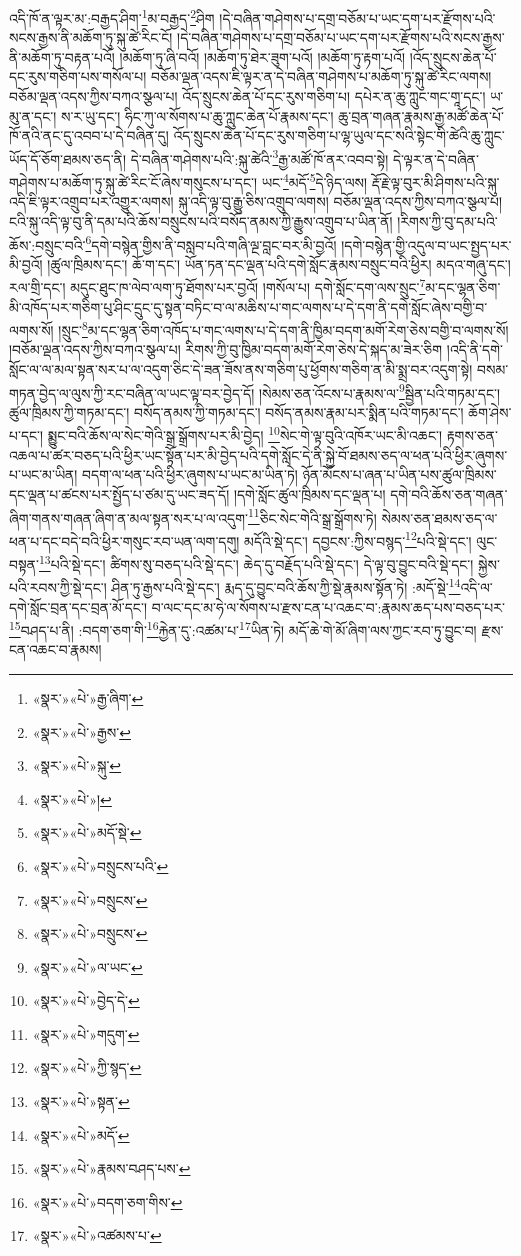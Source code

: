 འདི་ཁོ་ན་ལྟར་མ་:བརྒྱད་ཤིག་\footnote{«སྣར་»«པེ་»རྒྱ་ཞིག་}མ་བརྒྱད་\footnote{«སྣར་»«པེ་»རྒྱས་}ཤིག །དེ་བཞིན་གཤེགས་པ་དགྲ་བཅོམ་པ་ཡང་དག་པར་རྫོགས་པའི་སངས་རྒྱས་ནི་མཆོག་ཏུ་སྐུ་ཚེ་རིང་ངོ། །དེ་བཞིན་གཤེགས་པ་དགྲ་བཅོམ་པ་ཡང་དག་པར་རྫོགས་པའི་སངས་རྒྱས་ནི་མཆོག་ཏུ་བརྟན་པའོ། །མཆོག་ཏུ་ཞི་བའོ། །མཆོག་ཏུ་ཐེར་ཟུག་པའོ། །མཆོག་ཏུ་རྟག་པའོ། །འོད་སྲུངས་ཆེན་པོ་དང་རུས་གཅིག་པས་གསོལ་པ། བཅོམ་ལྡན་འདས་ཇི་ལྟར་ན་དེ་བཞིན་གཤེགས་པ་མཆོག་ཏུ་སྐུ་ཚེ་རིང་ལགས། བཅོམ་ལྡན་འདས་ཀྱིས་བཀའ་སྩལ་པ། འོད་སྲུངས་ཆེན་པོ་དང་རུས་གཅིག་པ། དཔེར་ན་ཆུ་ཀླུང་གང་གཱ་དང་། ཡ་མུ་ན་དང་། ས་ར་ཡུ་དང་། ཧིང་ཀུ་ལ་སོགས་པ་ཆུ་ཀླུང་ཆེན་པོ་རྣམས་དང་། ཆུ་བྲན་གཞན་རྣམས་རྒྱ་མཚོ་ཆེན་པོ་ཁོ་ནའི་ནང་དུ་འབབ་པ་དེ་བཞིན་དུ། འོད་སྲུངས་ཆེན་པོ་དང་རུས་གཅིག་པ་ལྷ་ཡུལ་དང་སའི་སྟེང་གི་ཚེའི་ཆུ་ཀླུང་ཡོད་དོ་ཅོག་ཐམས་ཅད་ནི། དེ་བཞིན་གཤེགས་པའི་:སྐུ་ཚེའི་\footnote{«སྣར་»«པེ་»སྐུ་}རྒྱ་མཚོ་ཁོ་ནར་འབབ་སྟེ། དེ་ལྟར་ན་དེ་བཞིན་གཤེགས་པ་མཆོག་ཏུ་སྐུ་ཚེ་རིང་ངོ་ཞེས་གསུངས་པ་དང་། ཡང་\footnote{«སྣར་»«པེ་»།}མདོ་\footnote{«སྣར་»«པེ་»མདོ་སྡེ་}དེ་ཉིད་ལས། རྡོ་རྗེ་ལྟ་བུར་མི་ཤིགས་པའི་སྐུ་འདི་ཇི་ལྟར་འགྲུབ་པར་འགྱུར་ལགས། སྐུ་འདི་ལྟ་བུ་རྒྱུ་ཅིས་འགྲུབ་ལགས། བཅོམ་ལྡན་འདས་ཀྱིས་བཀའ་སྩལ་པ། ངའི་སྐུ་འདི་ལྟ་བུ་ནི་དམ་པའི་ཆོས་བསྲུངས་པའི་བསོད་ནམས་ཀྱི་རྒྱུས་འགྲུབ་པ་ཡིན་ནོ། །རིགས་ཀྱི་བུ་དམ་པའི་ཆོས་:བསྲུང་བའི་\footnote{«སྣར་»«པེ་»བསྲུངས་པའི་}དགེ་བསྙེན་གྱིས་ནི་བསླབ་པའི་གཞི་ལྔ་བླང་བར་མི་བྱའོ། །དགེ་བསྙེན་གྱི་འདུལ་བ་ཡང་སྤྱད་པར་མི་བྱའོ། །ཚུལ་ཁྲིམས་དང་། ཆོ་ག་དང་། ཡོན་ཏན་དང་ལྡན་པའི་དགེ་སློང་རྣམས་བསྲུང་བའི་ཕྱིར། མདའ་གཞུ་དང་། རལ་གྲི་དང་། མདུང་ཐུང་ཁ་ལེབ་ལག་ཏུ་ཐོགས་པར་བྱའོ། །གསོལ་པ། དགེ་སློང་དག་ལས་སྲུང་\footnote{«སྣར་»«པེ་»བསྲུངས་}མ་དང་ལྷན་ཅིག་མི་འཁོད་པར་གཅིག་པུ་ཤིང་དྲུང་དུ་སྟན་བཏིང་བ་ལ་མཆིས་པ་གང་ལགས་པ་དེ་དག་ནི་དགེ་སློང་ཞེས་བགྱི་བ་ལགས་སོ། །སྲུང་\footnote{«སྣར་»«པེ་»བསྲུངས་}མ་དང་ལྷན་ཅིག་འཁོད་པ་གང་ལགས་པ་དེ་དག་ནི་ཁྱིམ་བདག་མགོ་རེག་ཅེས་བགྱི་བ་ལགས་སོ། །བཅོམ་ལྡན་འདས་ཀྱིས་བཀའ་སྩལ་པ། རིགས་ཀྱི་བུ་ཁྱིམ་བདག་མགོ་རེག་ཅེས་དེ་སྐད་མ་ཟེར་ཅིག །འདི་ནི་དགེ་སློང་ལ་ལ་མལ་སྟན་སར་པ་ལ་འདུག་ཅིང་དེ་ཟན་ཟོས་ནས་གཅིག་པུ་ཕྱོགས་གཅིག་ན་མི་སྨྲ་བར་འདུག་སྟེ། བསམ་གཏན་བྱེད་ལ་ལུས་ཀྱི་རང་བཞིན་ལ་ཡང་ལྟ་བར་བྱེད་དོ། །སེམས་ཅན་འོངས་པ་རྣམས་ལ་\footnote{«སྣར་»«པེ་»ལ་ཡང་}སྦྱིན་པའི་གཏམ་དང་། ཚུལ་ཁྲིམས་ཀྱི་གཏམ་དང་། བསོད་ནམས་ཀྱི་གཏམ་དང་། བསོད་ནམས་རྣམ་པར་སྨིན་པའི་གཏམ་དང་། ཆོག་ཤེས་པ་དང་། སྨྱུང་བའི་ཆོས་ལ་སེང་གེའི་སྒྲ་སྒྲོགས་པར་མི་བྱེད། \footnote{«སྣར་»«པེ་»བྱེད་དེ་}སེང་གེ་ལྟ་བུའི་འཁོར་ཡང་མི་འཆང་། རྟགས་ཅན་འཆལ་པ་ཚར་བཅད་པའི་ཕྱིར་ཡང་སྟོན་པར་མི་བྱེད་པའི་དགེ་སློང་དེ་ནི་སྐྱེ་བོ་ཐམས་ཅད་ལ་ཕན་པའི་ཕྱིར་ཞུགས་པ་ཡང་མ་ཡིན། བདག་ལ་ཕན་པའི་ཕྱིར་ཞུགས་པ་ཡང་མ་ཡིན་ཏེ། ཉོན་མོངས་པ་ཞན་པ་ཡིན་པས་ཚུལ་ཁྲིམས་དང་ལྡན་པ་ཚངས་པར་སྤྱོད་པ་ཙམ་དུ་ཡང་ཟད་དོ། །དགེ་སློང་ཚུལ་ཁྲིམས་དང་ལྡན་པ། དགེ་བའི་ཆོས་ཅན་གཞན་ཞིག་གནས་གཞན་ཞིག་ན་མལ་སྟན་སར་པ་ལ་འདུག་\footnote{«སྣར་»«པེ་»གདུག་}ཅིང་སེང་གེའི་སྒྲ་སྒྲོགས་ཏེ། སེམས་ཅན་ཐམས་ཅད་ལ་ཕན་པ་དང་བདེ་བའི་ཕྱིར་གསུང་རབ་ཡན་ལག་དགུ། མདོའི་སྡེ་དང་། དབྱངས་:ཀྱིས་བསྙད་\footnote{«སྣར་»«པེ་»ཀྱི་སྙད་}པའི་སྡེ་དང་། ལུང་བསྟན་\footnote{«སྣར་»«པེ་»སྟན་}པའི་སྡེ་དང་། ཚིགས་སུ་བཅད་པའི་སྡེ་དང་། ཆེད་དུ་བརྗོད་པའི་སྡེ་དང་། དེ་ལྟ་བུ་བྱུང་བའི་སྡེ་དང་། སྐྱེས་པའི་རབས་ཀྱི་སྡེ་དང་། ཤིན་ཏུ་རྒྱས་པའི་སྡེ་དང་། རྨད་དུ་བྱུང་བའི་ཆོས་ཀྱི་སྡེ་རྣམས་སྟོན་ཏེ། :མདོ་སྡེ་\footnote{«སྣར་»«པེ་»མདོ་}འདི་ལ་དགེ་སློང་བྲན་དང་བྲན་མོ་དང་། བ་ལང་དང་མ་ཧེ་ལ་སོགས་པ་རྫས་ངན་པ་འཆང་བ་:རྣམས་ཆད་པས་བཅད་པར་\footnote{«སྣར་»«པེ་»རྣམས་བཤད་པས་}བཤད་པ་ནི། :བདག་ཅག་གི་\footnote{«སྣར་»«པེ་»བདག་ཅག་གིས་}རྐྱེན་དུ་:འཚམ་པ་\footnote{«སྣར་»«པེ་»འཚམས་པ་}ཡིན་ཏེ། མདོ་ཆེ་གེ་མོ་ཞིག་ལས་ཀྱང་རབ་ཏུ་བྱུང་བ། རྫས་ངན་འཆང་བ་རྣམས། 